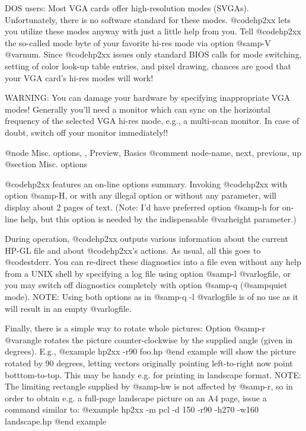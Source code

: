 DOS users: Most VGA cards offer high-resolution modes (SVGAs). Unfortunately,
there is no software standard for these modes. @code{hp2xx} lets you
utilize these modes anyway with just a little help from you.
Tell @code{hp2xx} the so-called mode byte of your favorite hi-res mode
via option @samp{-V @var{num}}. Since @code{hp2xx} issues only standard
BIOS calls for mode switching, setting of color look-up table entries,
and pixel drawing, chances are good that your VGA card's hi-res modes
will work!

WARNING: You can damage your hardware by specifying inappropriate VGA modes!
Generally you'll need a monitor which can sync on the horizontal frequency
of the selected VGA hi-res mode, e.g., a multi-scan monitor. In case of
doubt, switch off your monitor immediately!!



@node Misc. options, , Preview, Basics
@comment  node-name,  next,  previous,  up
@section Misc. options

@code{hp2xx} features an on-line options summary. Invoking @code{hp2xx}
with option @samp{-H}, or with any illegal option or without any
parameter, will display about 2 pages of text. (Note: I'd have preferred
option @samp{-h} for on-line help, but this option is needed by the
indispensable @var{height} parameter.)

During operation, @code{hp2xx} outputs various information about the current
HP-GL file and about @code{hp2xx}'s actions. As usual, all this goes to
@code{stderr}. You can re-direct these diagnostics into a file even without
any help from a UNIX shell by specifying a log file using option
@samp{-l @var{logfile}}, or you may switch off diagnostics completely
with option @samp{-q} (@samp{quiet} mode). NOTE: Using both options
as in @samp{-q -l @var{logfile}} is of no use as it will result in an
empty @var{logfile}.

Finally, there is a simple way to rotate whole pictures:
Option @samp{-r @var{angle}} rotates the picture counter-clockwise by
the supplied angle (given in degrees). E.g.,
@example
hp2xx -r90 foo.hp
@end example
will show the picture rotated by 90 degrees, letting vectors originally
pointing left-to-right now point botttom-to-top. This may be handy e.g. for
printing in landscape format.
NOTE: The limiting rectangle supplied by @samp{-hw} is not affected by
@samp{-r}, so in order to obtain e.g. a full-page landscape picture on an
A4 page, issue a command similar to:
@example
hp2xx -m pcl -d 150 -r90 -h270 -w160 landscape.hp
@end example




